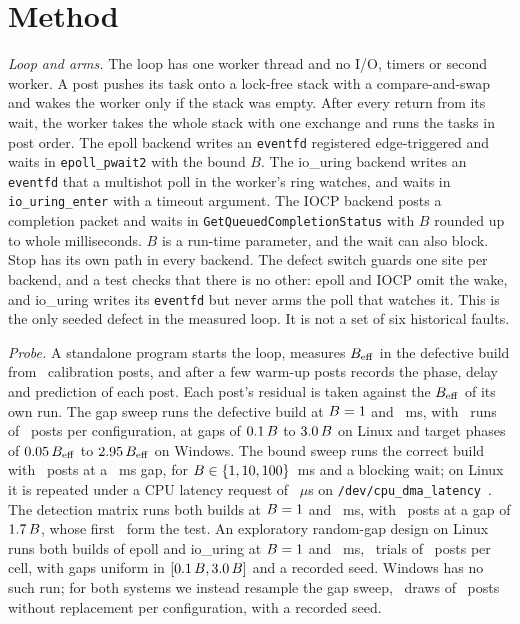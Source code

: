 \section{Method}\label{sec:method}

\emph{Loop and arms.} The loop has one worker thread and no I/O, timers or second worker. A
post pushes its task onto a lock-free stack with a compare-and-swap and wakes the worker only if
the stack was empty. After every return from its wait, the worker takes the whole stack with
one exchange and runs the tasks in post order. The epoll backend writes an \texttt{eventfd}
registered edge-triggered and waits in \texttt{epoll\_\allowbreak{}pwait2} with the bound $B$.
The io\_uring backend writes an \texttt{eventfd} that a multishot poll in the worker's ring
watches, and waits in \texttt{io\_\allowbreak{}uring\_\allowbreak{}enter} with a timeout
argument. The IOCP backend posts a completion packet and waits in
\texttt{GetQueued\allowbreak{}Completion\allowbreak{}Status} with $B$ rounded up to whole
milliseconds. $B$ is a run-time parameter, and the wait can also block. Stop has its own path
in every backend. The defect switch guards one site per backend, and a test checks that there
is no other: epoll and IOCP omit the wake, and io\_uring writes its \texttt{eventfd} but never
arms the poll that watches it. This is the only seeded defect in the measured loop. It is
not a set of six historical faults.

\emph{Probe.} A standalone program starts the loop, measures $B_{\mathrm{eff}}$ in the defective build
from \WakeCalibPosts\ calibration posts, and after a few warm-up posts records the phase, delay
and prediction of each post. Each post's residual is taken against the $B_{\mathrm{eff}}$ of its own run.
The gap sweep runs the defective build at $B = 1$ and \WakeBMidMs~ms, with
\WakeSweepSteps\ runs of \WakeSweepStepPosts\ posts per configuration, at gaps of
$0.1\,B$ to $3.0\,B$ on Linux and target phases of
$0.05\,B_{\mathrm{eff}}$ to $2.95\,B_{\mathrm{eff}}$ on Windows. The bound sweep
runs the correct build with \WakeBoundPosts\ posts at a \WakeBoundGapMs~ms gap, for
$B \in \{1, 10, 100\}$~ms and a blocking wait; on Linux it is
repeated under a CPU latency request of \WakeQosUs~$\mu$s on
\texttt{/dev/cpu\_dma\_latency}~\cite{kernel2026cpuidle}. The detection matrix runs both builds
at $B = 1$ and \WakeBLargeMs~ms, with \WakeMatrixPosts\ posts at a gap of
$1.7\,B$, whose first \WakeTestPosts\ form the test. An exploratory random-gap
design on Linux runs both builds of epoll and io\_uring at $B = 1$ and
\WakeBMidMs~ms, \WakeRandomTrials\ trials of \WakeTestPosts\ posts per cell, with gaps uniform
in $[0.1\,B, 3.0\,B]$ and a recorded seed. Windows has no such run;
for both systems we instead resample the gap sweep, \WakeResampleTrials\ draws of
\WakeTestPosts\ posts without replacement per configuration, with a recorded seed.

